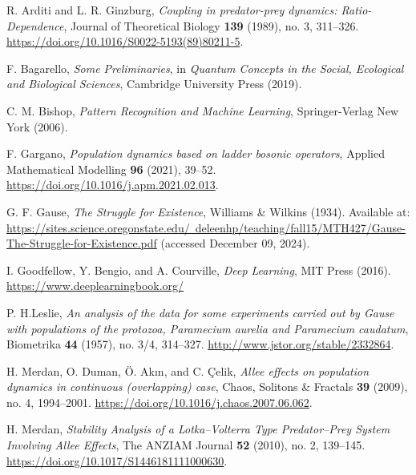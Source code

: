 \documentclass[11pt,reqno]{amsart}
\numberwithin{equation}{section}
\theoremstyle{plain}
\begin{document}
\begin{thebibliography}{ABGM19} %

R. Arditi and L. R. Ginzburg, \emph{Coupling in predator-prey dynamics: Ratio-Dependence}, Journal of Theoretical Biology \textbf{139} (1989), no. 3, 311--326. \href{https://doi.org/10.1016/S0022-5193(89)80211-5}{https://doi.org/10.1016/S0022-5193(89)80211-5}.

F. Bagarello, \emph{Some Preliminaries}, in \emph{Quantum Concepts in the Social, Ecological and Biological Sciences}, Cambridge University Press (2019). 

C. M. Bishop, \emph{Pattern Recognition and Machine Learning}, Springer-Verlag New York (2006).


F. Gargano, \emph{Population dynamics based on ladder bosonic operators}, Applied Mathematical Modelling \textbf{96} (2021), 39--52. \href{https://doi.org/10.1016/j.apm.2021.02.013}{https://doi.org/10.1016/j.apm.2021.02.013}.

G. F. Gause, \emph{The Struggle for Existence}, Williams & Wilkins (1934). 
Available at: \href{https://sites.science.oregonstate.edu/~deleenhp/teaching/fall15/MTH427/Gause-The-Struggle-for-Existence.pdf}{https://sites.science.oregonstate.edu/~deleenhp/teaching/fall15/MTH427/Gause-The-Struggle-for-Existence.pdf} (accessed December 09, 2024).


I. Goodfellow, Y. Bengio, and A. Courville, \emph{Deep Learning}, MIT Press (2016). 
\href{https://www.deeplearningbook.org/}{https://www.deeplearningbook.org/}


P. H.Leslie, \emph{An analysis of the data for some experiments carried out by Gause with populations of the protozoa, Paramecium aurelia and Paramecium caudatum}, Biometrika \textbf{44} (1957), no. 3/4, 314--327. \href{http://www.jstor.org/stable/2332864}{http://www.jstor.org/stable/2332864}.


H. Merdan, O. Duman, Ö. Akın, and C. Çelik, \emph{Allee effects on population dynamics in continuous (overlapping) case}, Chaos, Solitons \& Fractals \textbf{39} (2009), no. 4, 1994--2001. \href{https://doi.org/10.1016/j.chaos.2007.06.062}{https://doi.org/10.1016/j.chaos.2007.06.062}.

H. Merdan, \emph{Stability Analysis of a Lotka–Volterra Type Predator–Prey System Involving Allee Effects}, The ANZIAM Journal \textbf{52} (2010), no. 2, 139--145. \href{https://doi.org/10.1017/S1446181111000630}{https://doi.org/10.1017/S1446181111000630}.



\end{thebibliography}
\end{document}
